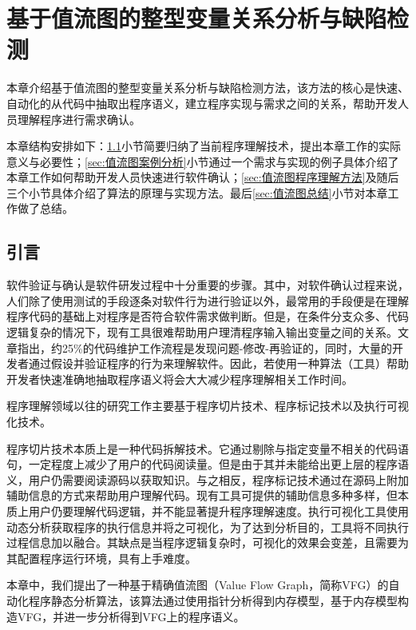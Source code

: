 
\chapter{基于值流图的整型变量关系分析与缺陷检测}
\label{sec:值流图}

本章介绍基于值流图的整型变量关系分析与缺陷检测方法，该方法的核心是快速、自动化的从代码中抽取出程序语义，建立程序实现与需求之间的关系，帮助开发人员理解程序进行需求确认。

本章结构安排如下：\ref{sec:值流图引言}小节简要归纳了当前程序理解技术，提出本章工作的实际意义与必要性；\ref{sec:值流图案例分析}小节通过一个需求与实现的例子具体介绍了本章工作如何帮助开发人员快速进行软件确认；\ref{sec:值流图程序理解方法}及随后三个小节具体介绍了算法的原理与实现方法。最后\ref{sec:值流图总结}小节对本章工作做了总结。

\section{引言}
\label{sec:值流图引言}

软件验证与确认是软件研发过程中十分重要的步骤。其中，对软件确认过程来说，人们除了使用测试的手段逐条对软件行为进行验证以外，最常用的手段便是在理解程序代码的基础上对程序是否符合软件需求做判断。但是，在条件分支众多、代码逻辑复杂的情况下，现有工具很难帮助用户理清程序输入输出变量之间的关系。文章指出，约25\%的代码维护工作流程是发现问题-修改-再验证的，同时，大量的开发者通过假设并验证程序的行为来理解软件\cite{maalej2014comprehension}。因此，若使用一种算法（工具）帮助开发者快速准确地抽取程序语义将会大大减少程序理解相关工作时间。

程序理解\cite{boysen1979factors, sackman1968exploratory}领域以往的研究工作主要基于程序切片技术、程序标记技术以及执行可视化技术。

程序切片技术\cite{binkley1996program}本质上是一种代码拆解技术。它通过剔除与指定变量不相关的代码语句，一定程度上减少了用户的代码阅读量。但是由于其并未能给出更上层的程序语义，用户仍需要阅读源码以获取知识。与之相反，程序标记技术\cite{sulir2017labeling}通过在源码上附加辅助信息的方式来帮助用户理解代码。现有工具可提供的辅助信息多种多样，但本质上用户仍要理解代码逻辑，并不能显著提升程序理解速度。执行可视化工具使用动态分析获取程序的执行信息并将之可视化，为了达到分析目的，工具将不同执行过程信息加以融合。其缺点是当程序逻辑复杂时，可视化的效果会变差，且需要为其配置程序运行环境，具有上手难度。 

本章中，我们提出了一种基于精确值流图（Value Flow Graph，简称VFG）的自动化程序静态分析算法，该算法通过使用指针分析得到内存模型，基于内存模型构造VFG，并进一步分析得到VFG上的程序语义。

